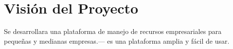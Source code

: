 \chapter{Visión del Proyecto}
Se desarrollara una plataforma de manejo de recursos empresariales para pequeñas y medianas empresas.--- es una plataforma amplia y fácil de usar.
